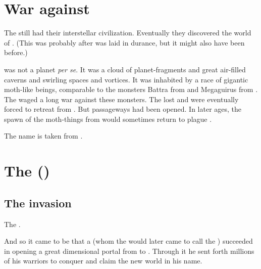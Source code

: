 \section{War against \Shuggon}
\index{\Shuggon}
The \ophidians still had their interstellar civilization. 
Eventually they discovered the world of \Shuggon. 
(This was probably after \Sethicus was laid in durance, but it might also have been before.)

\Shuggon was not a planet \emph{per se}. 
It was a cloud of planet-fragments and great air-filled caverns and swirling spaces and vortices. 
It was inhabited by a race of gigantic moth-like beings, comparable to the monsters Battra from \cite{Movie:GodzillaVsMothra} and Megaguirus from \cite{Movie:GodzillaVsMegaguirus}. 
The \ophidians waged a long war against these monsters.
The \ophidians lost and were eventually forced to retreat from \Shuggon. 
But passageways had been opened. 
In later ages, the spawn of the moth-things from \Shuggon would sometimes return to plague \Miith. 

The name \quo{\Shuggon} is taken from \cite{HPLovecraft:TheBlackTomeofAlsophocus}. 














\section{The \FirstBanewar ()}









\subsection{The \bane{} invasion}
\index{\firstbanewar}
The \banes {}.

And so it came to be that a \baneking{} (whom the \dragons{} would later came to call the \quo{\Voidbringer}) succeeded in opening a great dimensional portal from \Erebos{} to \Miith{}. 
Through it he sent forth millions of his \bane{} warriors to conquer and claim the new world in his name. 

